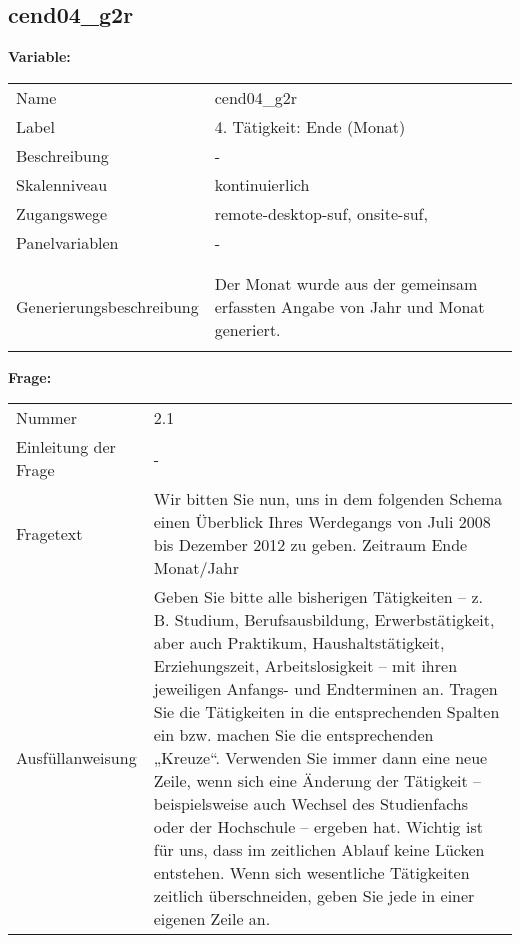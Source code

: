 	
	
	\subsection{cend04\_g2r}
	\label{subSection:cend04_g2r}

	\noindent\textbf{Variable:}\\
		\begin{tabular}{lL{11.3cm}}
			\label{tableVariable:cend04_g2r}
			Name & cend04\_g2r \\
			Label & 4. Tätigkeit: Ende (Monat) \\
			Beschreibung & - \\
			Skalenniveau & kontinuierlich \\
			Zugangswege &
				remote-desktop-suf,
				onsite-suf,
 \\
			Panelvariablen & -
			 \\
			 \\
 \\
					Generierungsbeschreibung & Der Monat wurde aus der gemeinsam erfassten Angabe von Jahr und Monat generiert. 
				 \\	
			 \\
		\end{tabular}

		\vspace*{1 cm}
		\noindent\textbf{Frage:}\\
		\begin{tabular}{lL{11.3cm}}
			\label{tableQuestion:cend04_g2r}
			Nummer & 2.1 \\
			Einleitung der Frage & - \\
			Fragetext & Wir bitten Sie nun, uns in dem folgenden Schema einen Überblick Ihres Werdegangs von Juli 2008 bis Dezember 2012 zu geben.
Zeitraum
Ende
Monat/Jahr \\
			Ausfüllanweisung & Geben Sie bitte alle bisherigen Tätigkeiten – z. B. Studium, Berufsausbildung, Erwerbstätigkeit, aber auch Praktikum, Haushaltstätigkeit,
Erziehungszeit, Arbeitslosigkeit – mit ihren jeweiligen Anfangs- und Endterminen an. Tragen Sie die Tätigkeiten in die entsprechenden Spalten ein bzw. machen Sie die entsprechenden „Kreuze“. Verwenden Sie immer dann eine neue Zeile, wenn sich eine Änderung der Tätigkeit – beispielsweise auch Wechsel des Studienfachs oder der Hochschule – ergeben hat. Wichtig ist für uns, dass im zeitlichen Ablauf keine Lücken entstehen. Wenn sich wesentliche Tätigkeiten zeitlich überschneiden, geben Sie jede in einer eigenen Zeile an. \\
		\end{tabular}





